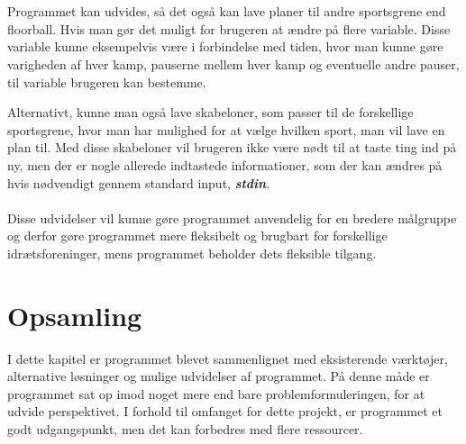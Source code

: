 \\\\
Programmet kan udvides, så det også kan lave planer til andre sportsgrene end floorball. Hvis man gør det muligt for brugeren at ændre på flere variable. Disse variable kunne eksempelvis være i forbindelse med tiden, hvor man kunne gøre varigheden af hver kamp, pauserne mellem hver kamp og eventuelle andre pauser, til variable brugeren kan bestemme.
\par
Alternativt, kunne man også lave skabeloner, som passer til de forskellige sportsgrene, hvor man har mulighed for at vælge hvilken sport, man vil lave en plan til. Med disse skabeloner vil brugeren ikke være nødt til at taste ting ind på ny, men der er nogle allerede indtastede informationer, som der kan ændres på hvis nødvendigt gennem standard input, \textbf{\textit{stdin}}. 
\\\\
Disse udvidelser vil kunne gøre programmet anvendelig for en bredere målgruppe og derfor gøre programmet mere fleksibelt og brugbart for forskellige idrætsforeninger, mens programmet beholder dets fleksible tilgang.

\section*{Opsamling}
I dette kapitel er programmet blevet sammenlignet med eksisterende værktøjer, alternative løsninger og mulige udvidelser af programmet. På denne måde er programmet sat op imod noget mere end bare problemformuleringen, for at udvide perspektivet. I forhold til omfanget for dette projekt, er programmet et godt udgangspunkt, men det kan forbedres med flere ressourcer. 


